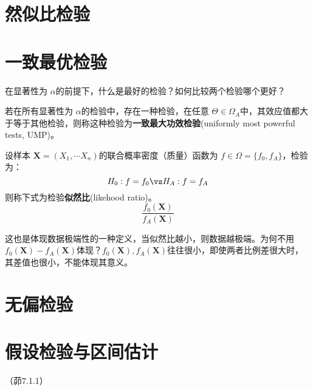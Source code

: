 \section{然似比检验}

\section{一致最优检验}

在显著性为 $\alpha$的前提下，什么是最好的检验？如何比较两个检验哪个更好？

\begin{definition}[一致最大功效检验]
    若在所有显著性为 $\alpha$的检验中，存在一种检验，在任意 $\Theta \in \Omega_A$中，其效应值都大于等于其他检验，则称这种检验为\textbf{一致最大功效检验}(uniformly most powerful tests, UMP)。
\end{definition}

\begin{definition}[似然比]
    设样本 $\mathbf{X}=(X_1,\cdots X_n)$的联合概率密度（质量）函数为 $f \in \Omega=\{ f_0, f_A \}$，检验为：
    \[ H_0: f = f_0 \vs H_A: f=f_A \]
    则称下式为检验\textbf{似然比}(likehood ratio)。
    \[ \frac{f_0(\mathbf{X})}{f_A(\mathbf{X})} \]
\end{definition}

这也是体现数据极端性的一种定义，当似然比越小，则数据越极端。为何不用 $f_0(\mathbf{X})-f_A(\mathbf{X})$体现？$f_0(\mathbf{X}), f_A(\mathbf{X})$往往很小，即使两者比例差很大时，其差值也很小，不能体现其意义。

\begin{theorem}
    
\end{theorem}

\section{无偏检验}

\section{假设检验与区间估计}

\begin{problemset}[错题记录]
    \item （茆7.1.1）
    \item
\end{problemset}

